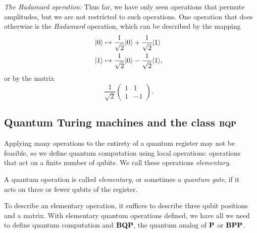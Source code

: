 \documentclass[12pt]{article}
\begin{document}
\begin{adjustwidth}{0.25in}{0in}
  \noindent \emph{The Hadamard operation:} Thus far, we have only seen
  operations that permute amplitudes, but we are not restricted to such
  operations. One operation that does otherwise is the \emph{Hadamard}
  operation, which can be described by the mapping
  \begin{align*}
    \qz &\mapsto \frac{1}{\sqrt{2}} \qz + \frac{1}{\sqrt{2}} \qo \\
    \qo &\mapsto \frac{1}{\sqrt{2}} \qz - \frac{1}{\sqrt{2}} \qo,
  \end{align*}
  or by the matrix
  $$
    \frac{1}{\sqrt{2}} \begin{pmatrix}
      1 & 1 \\
      1 & -1
    \end{pmatrix}.
  $$
\end{adjustwidth}

\subsection{Quantum Turing machines and the class $\mathbf{BQP}$}
Applying many operations to the entirety of a quantum register may not be
feasible, so we define quantum computation using local operations: operations
that act on a finite number of qubits. We call these operations
\emph{elementary}.
\begin{defn}
  A quantum operation is called \emph{elementary}, or sometimes a \emph{quantum
  gate}, if it acts on three or fewer qubits of the register.
\end{defn}
To describe an elementary operation, it suffices to describe three qubit
positions and a matrix. With elementary quantum operations defined, we have all
we need to define quantum computation and $\mathbf{BQP}$, the quantum analog of $\mathbf{P}$ or
$\mathbf{BPP}$.
\end{document}
